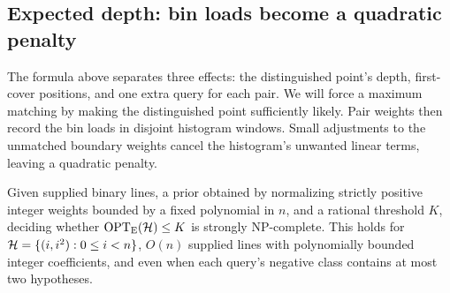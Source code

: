 \subsection{Expected depth: bin loads become a quadratic penalty}

The formula above separates three effects: the distinguished
point's depth, first-cover positions, and one extra query for
each pair. We will force a maximum matching by making the
distinguished point sufficiently likely. Pair weights then
record the bin loads in disjoint histogram windows.
Small adjustments to the unmatched boundary weights cancel the
histogram's unwanted linear terms, leaving a quadratic penalty.

\begin{theorem}
\label{thm:strong-average}
Given supplied binary lines, a prior obtained by normalizing
strictly positive integer weights bounded by a fixed polynomial in
$n$, and a rational threshold $K$, deciding whether
$\operatorname{OPT}_{\mathrm E}(\mathcal H)\le K$ is strongly NP-complete.
This holds for $\mathcal H=\{(i,i^2):0\le i<n\}$, $O(n)$ supplied lines
with polynomially bounded integer coefficients, and even when each
query's negative class contains at most two hypotheses.
\end{theorem}
